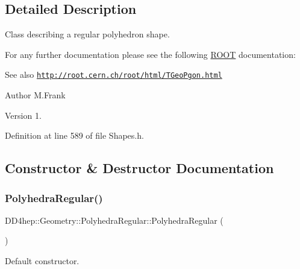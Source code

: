 \subsection{Detailed Description}
Class describing a regular polyhedron shape. 

For any further documentation please see the following \hyperlink{namespace_r_o_o_t}{R\+O\+OT} documentation\+: \begin{DoxySeeAlso}{See also}
\href{http://root.cern.ch/root/html/TGeoPgon.html}{\tt http\+://root.\+cern.\+ch/root/html/\+T\+Geo\+Pgon.\+html}
\end{DoxySeeAlso}
\begin{DoxyAuthor}{Author}
M.\+Frank 
\end{DoxyAuthor}
\begin{DoxyVersion}{Version}
1. 
\end{DoxyVersion}


Definition at line 589 of file Shapes.\+h.



\subsection{Constructor \& Destructor Documentation}
\hypertarget{class_d_d4hep_1_1_geometry_1_1_polyhedra_regular_a620021a8adf3f13d0fc6b84675478b78}{}\label{class_d_d4hep_1_1_geometry_1_1_polyhedra_regular_a620021a8adf3f13d0fc6b84675478b78} 
\subsubsection{\texorpdfstring{Polyhedra\+Regular()}{PolyhedraRegular()}\hspace{0.1cm}{\footnotesize\ttfamily [1/7]}}
{\footnotesize\ttfamily D\+D4hep\+::\+Geometry\+::\+Polyhedra\+Regular\+::\+Polyhedra\+Regular (\begin{DoxyParamCaption}{ }\end{DoxyParamCaption})\hspace{0.3cm}{\ttfamily [default]}}



Default constructor. 

\hypertarget{class_d_d4hep_1_1_geometry_1_1_polyhedra_regular_acfae5af7564277be9bd560f18336eeab}{}\label{class_d_d4hep_1_1_geometry_1_1_polyhedra_regular_acfae5af7564277be9bd560f18336eeab} 
